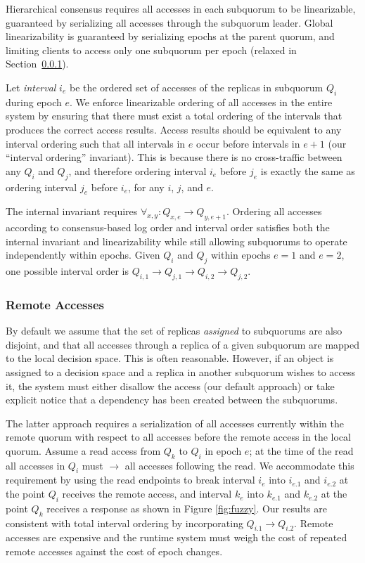 \documentclass[11pt,letterpaper]{article}
\begin{document}
Hierarchical consensus requires all accesses in each subquorum to be linearizable,
guaranteed by serializing all accesses through the subquorum leader.
Global linearizability is guaranteed by serializing epochs at the parent
quorum, and limiting clients to access only one subquorum per epoch (relaxed
in Section~\ref{sec:remote}).

Let \emph{interval} $i_e$ be the ordered set of accesses of the replicas in subquorum
$Q_i$ during epoch $e$.
We enforce linearizable ordering of all accesses in the entire system by
ensuring that there must exist a total ordering of the intervals that produces the correct
access results.
Access results should be equivalent to any interval ordering
such that all intervals in $e$ occur before intervals in $e+1$ (our ``interval
ordering'' invariant).
This is because there is no cross-traffic between any $Q_i$ and $Q_j$, and therefore
ordering interval $i_e$ before $j_e$ is exactly the same as ordering interval $j_e$
before $i_e$, for any $i$, $j$, and $e$.

The internal invariant requires $\forall_{x,y} : Q_{x,e} \rightarrow Q_{y,e+1}$.
Ordering all accesses according to consensus-based log order and interval order satisfies both the
internal invariant and linearizability  while still allowing subquorums to operate
independently within epochs.
Given $Q_i$ and $Q_j$ within epochs $e=1$ and $e=2$, one possible interval order is
$Q_{i,1} \rightarrow Q_{j,1} \rightarrow Q_{i,2} \rightarrow Q_{j,2}$.

\subsubsection{Remote Accesses}
\label{sec:remote}
\vspace{-.5em}

By default we assume that the set of replicas \emph{assigned} to subquorums are also
disjoint, and that all accesses through a replica of a given subquorum are mapped to the
local decision space.
This is often reasonable.
However, if an object is assigned to a decision space and a replica in another subquorum
wishes to
access it, the system must either disallow the access (our default approach) or take
explicit notice that a dependency has been created between the subquorums.

The latter approach requires a serialization of all accesses currently within the remote
quorum with respect to all accesses before the remote access in the local quorum.
Assume a read access from $Q_k$ to $Q_i$ in epoch $e$; at the time of the read all
accesses in $Q_i$ must $\rightarrow$ all accesses following the read.
We accommodate this requirement by using the read endpoints to break interval $i_e$ into
$i_{e.1}$ and $i_{e.2}$ at the point $Q_i$ receives the remote access, and interval $k_e$
into $k_{e.1}$ and $k_{e.2}$ at the point $Q_k$ receives a response as shown in
Figure \ref{fig:fuzzy}.
Our results are consistent with total interval ordering by incorporating $Q_{i.1}
\rightarrow Q_{i.2}$.
Remote accesses are expensive and the runtime system must weigh the cost of repeated
remote accesses against the cost of epoch changes.
\end{document}

